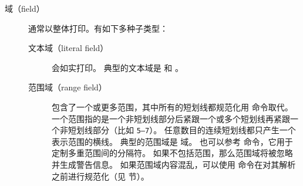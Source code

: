 \begin{description}
\begin{description}
\end{description}
\end{description}

\begin{description}

\item[域（field）] 通常以整体打印。有如下多种子类型：

\begin{description}

\item[文本域（literal field）]  会如实打印。
典型的文本域是  和 。


\item[范围域（range field）] 包含了一个或更多范围，其中所有的短划线都规范化用  命令取代。
一个范围指的是一个非短划线部分后紧跟一个或多个短划线再紧跟一个非短划线部分（比如 \texttt{5--7}）。
任意数目的连续短划线都只产生一个表示范围的横线。
典型的范围域是  域。
也可以参考  命令，它用于定制多重范围间的分隔符。
如果不包括范围，那么范围域将被忽略并生成警告信息。
如果范围域内容混乱，可以使用  命令在对其解析之前进行规范化（见  节）。



\end{description}
\end{description}
